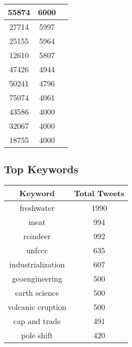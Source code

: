 \documentclass{article}\usepackage[T1]{fontenc}
\begin{document}
\begin{tabular}{|c|c|c|}
 \hline
55874 & 6000\\ 
 \hline
27714 & 5997\\ 
 \hline
25155 & 5964\\ 
 \hline
12610 & 5807\\ 
 \hline
47426 & 4944\\ 
 \hline
50241 & 4796\\ 
 \hline
75074 & 4061\\ 
 \hline
43586 & 4000\\ 
 \hline
32067 & 4000\\ 
 \hline
18755 & 4000\\ 
 \hline
\end{tabular}\subsection*{Top Keywords}\begin{tabular}{|c|c|}         \hline         Keyword & Total Tweets \\ 
 \hline
freshwater & 1990\\ 
 \hline
meat & 994\\ 
 \hline
reindeer & 992\\ 
 \hline
unfccc & 635\\ 
 \hline
industrialization & 607\\ 
 \hline
geoengineering & 500\\ 
 \hline
earth science & 500\\ 
 \hline
volcanic eruption & 500\\ 
 \hline
cap and trade & 491\\ 
 \hline
pole shift & 420\\ 
 \hline
\end{tabular}
\end{document}
